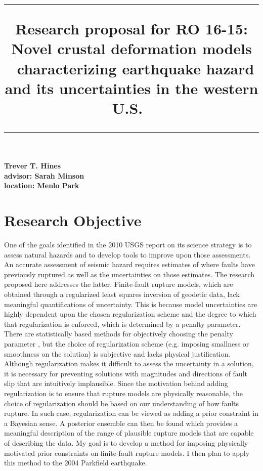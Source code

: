 \documentclass[12pt]{article}
\title{	
 \rule{\headwidth}{1.0pt}
 \raggedright
 \textbf{Research proposal for RO 16-15:
 Novel crustal deformation models \
 characterizing earthquake hazard and its uncertainties in the western U.S.}\
 \rule{\headwidth}{1.0pt}
 \date{}
 \vspace{-8ex}}
\begin{document}
 \maketitle
{\raggedright \large 
 \textbf{Trever T. Hines} \hfill\\
 \textbf{advisor: Sarah Minson}\hfill\\
 \textbf{location: Menlo Park}\hfill\\}

\section*{Research Objective}

One of the goals identified in the 2010 USGS report on its science strategy is to assess natural hazards and to develop tools to improve upon those assessments.  An accurate assessment of seismic hazard requires estimates of where faults have previously ruptured as well as the uncertainties on those estimates.  The research proposed here addresses the latter. Finite-fault rupture models, which are obtained through a regularized least squares inversion of geodetic data, lack meaningful quantifications of uncertainty. This is because model uncertainties are highly dependent upon the chosen regularization scheme and the degree to which that regularization is enforced, which is determined by a penalty parameter. There are statistically based methods for objectively choosing the penalty parameter \citep[e.g.][]{Yabuki1992,Fukuda2008}, but the choice of regularization scheme (e.g. imposing smallness or smoothness on the solution) is subjective and lacks physical justification.  Although regularization makes it difficult to assess the uncertainty in a solution, it is necessary for preventing solutions with magnitudes and directions of fault slip that are intuitively implausible. Since the motivation behind adding regularization is to ensure that rupture models are physically reasonable, the choice of regularization should be based on our understanding of how faults rupture.  In such case, regularization can be viewed as adding a prior constraint in a Bayesian sense. A posterior ensemble can then be found which provides a meaningful description of the range of plausible rupture models that are capable of describing the data.  My goal is to develop a method for imposing physically motivated prior constraints on finite-fault rupture models. I then plan to apply this method to the 2004 Parkfield earthquake.  
\end{document}
